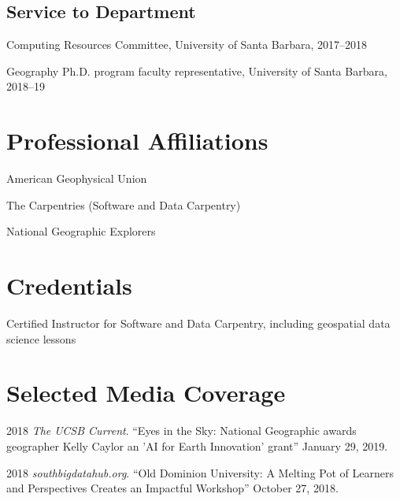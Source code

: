 \documentclass[12pt,letterpaper]{report}
\newcommand{\listitemspace}{0.15em}
\renewenvironment{itemize}
{\begin{list}{}{\setlength{\leftmargin}{0em}
			\setlength{\parskip}{0em}
			\setlength{\itemsep}{\listitemspace}
			\setlength{\parsep}{\listitemspace}}}
	{\end{list}}
\begin{document}
	\subsection*{Service to Department}
	
	\begin{itemize}
		
		\item Computing Resources Committee, University of Santa Barbara, 2017--2018
		
		\item Geography Ph.D. program faculty representative, University of Santa Barbara, 2018--19
		
	\end{itemize}
	
	
	
	\section*{Professional Affiliations}
	
	\begin{itemize}
		
		\item American Geophysical Union
		
		\item The Carpentries (Software and Data Carpentry)

                \item National Geographic Explorers
		
	\end{itemize}
	
	
	
	\section*{Credentials}
	
	\begin{itemize}
		
		\item Certified Instructor for Software and Data Carpentry, including geospatial data science lessons
		
	\end{itemize}
		
	
	
	\section*{Selected Media Coverage}
	
	\begin{tablist}
		
		\item 2018 \tab \textit{The UCSB Current}. \enquote{Eyes in the Sky: National Geographic awards geographer Kelly Caylor an 'AI for Earth Innovation' grant} January 29, 2019.
		
		\item 2018 \tab \textit{southbigdatahub.org}. \enquote{Old Dominion University: A Melting Pot of Learners and Perspectives Creates an Impactful Workshop} October 27, 2018.
				
	\end{tablist}
	
\end{document}
